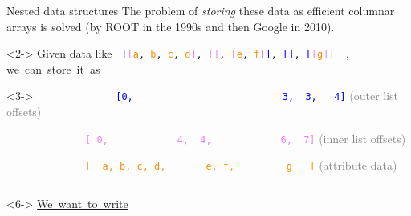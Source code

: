 \documentclass[aspectratio=169]{beamer}
\begin{document}
\begin{frame}[fragile]{Nested data structures}
\vspace{0.5 cm}
The problem of {\it storing} these data as efficient columnar arrays is solved (by ROOT in the 1990s and then Google in 2010).

\vspace{0.2 cm}
\begin{uncoverenv}<2->
Given data like {\tt\small \textcolor{white}{[}\textcolor{blue}{[}\textcolor{violet}{[}\textcolor{darkorange}{a}, \textcolor{darkorange}{b}, \textcolor{darkorange}{c}, \textcolor{darkorange}{d}\textcolor{violet}{]}, \textcolor{violet}{[]}, \textcolor{violet}{[}\textcolor{darkorange}{e}, \textcolor{darkorange}{f}\textcolor{violet}{]}\textcolor{blue}{]}, \textcolor{blue}{[]}, \textcolor{blue}{[}\textcolor{violet}{[}\textcolor{darkorange}{g}\textcolor{violet}{]}\textcolor{blue}{]}\ \textcolor{white}{]}}, \mbox{we can store it as\hspace{-1 cm}}
\end{uncoverenv}

\begin{uncoverenv}<3->
\textcolor{white}{Given data like}
             {\tt\small \textcolor{blue}{[0,\ \ \ \ \ \ \ \ \ \ \ \ \ \ \ \ \ \ \ \ \ \ \ \ \ \ 3,\ \ 3,\ \ \ 4]}} \textcolor{gray}{(outer list offsets)}

\textcolor{white}{Given data like}
             {\tt\small \textcolor{violet}{[\ 0,\ \ \ \ \ \ \ \ \ \ \ \ 4,\ \ 4,\ \ \ \ \ \ \ \ \ \ \ \ 6,\ \ 7]}} \textcolor{gray}{(inner list offsets)}

\textcolor{white}{Given data like}
             {\tt\small \textcolor{darkorange}{[\ \ a,\ b,\ c,\ d,\ \ \ \ \ \ \ e,\ f,\ \ \ \ \ \ \ \ \ g\ \ \ ]}} \textcolor{gray}{(attribute data)}
\end{uncoverenv}

\vspace{0.2 cm}

\vspace{0.2 cm}

\vspace{0.2 cm}
\begin{columns}[t]
\begin{uncoverenv}<6->
\mbox{\hspace{-0.1 cm}\underline{We want to write}}


\end{uncoverenv}
\end{columns}
\end{frame}
\end{document}
